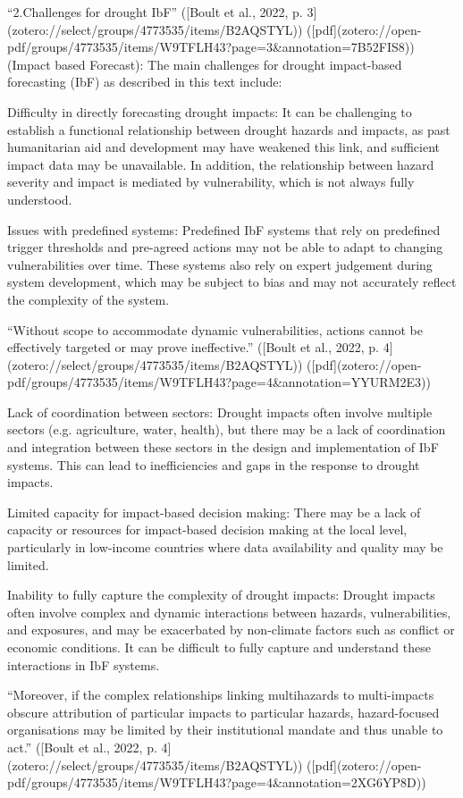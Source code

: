 {“2.Challenges for drought IbF” ([Boult et al., 2022, p. 3](zotero://select/groups/4773535/items/B2AQSTYL)) ([pdf](zotero://open-pdf/groups/4773535/items/W9TFLH43?page=3&annotation=7B52FIS8)) (Impact based Forecast):
The main challenges for drought impact-based forecasting (IbF) as described in this text include:

Difficulty in directly forecasting drought impacts: It can be challenging to establish a functional relationship between drought hazards and impacts, as past humanitarian aid and development may have weakened this link, and sufficient impact data may be unavailable. In addition, the relationship between hazard severity and impact is mediated by vulnerability, which is not always fully understood.

Issues with predefined systems: Predefined IbF systems that rely on predefined trigger thresholds and pre-agreed actions may not be able to adapt to changing vulnerabilities over time. These systems also rely on expert judgement during system development, which may be subject to bias and may not accurately reflect the complexity of the system.

“Without scope to accommodate dynamic vulnerabilities, actions cannot be effectively targeted or may prove ineffective.” ([Boult et al., 2022, p. 4](zotero://select/groups/4773535/items/B2AQSTYL)) ([pdf](zotero://open-pdf/groups/4773535/items/W9TFLH43?page=4&annotation=YYURM2E3))

Lack of coordination between sectors: Drought impacts often involve multiple sectors (e.g. agriculture, water, health), but there may be a lack of coordination and integration between these sectors in the design and implementation of IbF systems. This can lead to inefficiencies and gaps in the response to drought impacts.

Limited capacity for impact-based decision making: There may be a lack of capacity or resources for impact-based decision making at the local level, particularly in low-income countries where data availability and quality may be limited.

Inability to fully capture the complexity of drought impacts: Drought impacts often involve complex and dynamic interactions between hazards, vulnerabilities, and exposures, and may be exacerbated by non-climate factors such as conflict or economic conditions. It can be difficult to fully capture and understand these interactions in IbF systems.

“Moreover, if the complex relationships linking multihazards to multi-impacts obscure attribution of particular impacts to particular hazards, hazard-focused organisations may be limited by their institutional mandate and thus unable to act.” ([Boult et al., 2022, p. 4](zotero://select/groups/4773535/items/B2AQSTYL)) ([pdf](zotero://open-pdf/groups/4773535/items/W9TFLH43?page=4&annotation=2XG6YP8D))

}
